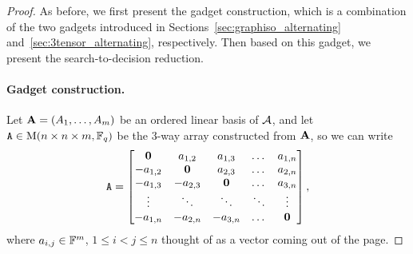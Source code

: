\documentclass[11pt]{article}
\begin{document}
\begin{proof}
As before, we first present the gadget construction, which is a combination of the 
two gadgets introduced in 
Sections~\ref{sec:graphiso_alternating} 
and~\ref{sec:3tensor_alternating}, respectively. Then based on this gadget, we 
present the search-to-decision reduction. 

\paragraph{Gadget construction.} 
Let $\mathbf{A}=(A_1, \dots, A_m)$ be an ordered 
linear basis of $\mathcal{A}$, 
and let  
$\mathtt{A} \in \mathrm{M}(n\times n\times m, \mathbb{F}_q)$ be the 3-way array constructed from 
$\mathbf{A}$, so we can write
$$
\mathtt{A}=\begin{bmatrix}
\mathbf{0} & a_{1,2} & a_{1,3} & \dots & a_{1,n} \\
-a_{1,2} & \mathbf{0} & a_{2,3} & \dots & a_{2,n} \\
-a_{1,3} & -a_{2,3} & \mathbf{0} & \dots & a_{3,n}\\
\vdots & \ddots & \ddots & \ddots & \vdots \\
-a_{1,n} & -a_{2,n} & -a_{3,n} & \dots & \mathbf{0}
\end{bmatrix},
$$
where $a_{i,j} \in \mathbb{F}^m$, $1\leq i<j\leq n$ thought of as a vector coming out of the page.


\end{proof}
\end{document}
